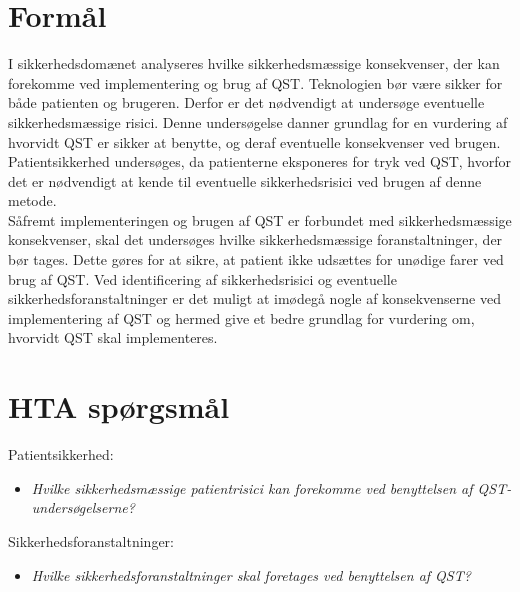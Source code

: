 \section{Formål} 
I sikkerhedsdomænet analyseres hvilke sikkerhedsmæssige konsekvenser, der kan forekomme ved implementering og brug af QST. Teknologien bør være sikker for både patienten og brugeren. Derfor er det nødvendigt at undersøge eventuelle sikkerhedsmæssige risici. Denne undersøgelse danner grundlag for en vurdering af hvorvidt QST er sikker at benytte, og deraf eventuelle konsekvenser ved brugen. \\
Patientsikkerhed undersøges, da patienterne eksponeres for tryk ved QST, hvorfor det er nødvendigt at kende til eventuelle sikkerhedsrisici ved brugen af denne metode. \\
Såfremt implementeringen og brugen af QST er forbundet med sikkerhedsmæssige konsekvenser, skal det undersøges hvilke sikkerhedsmæssige foranstaltninger, der bør tages. Dette gøres for at sikre, at patient ikke udsættes for unødige farer ved brug af QST. Ved identificering af sikkerhedsrisici og eventuelle sikkerhedsforanstaltninger er det muligt at imødegå nogle af konsekvenserne ved implementering af QST og hermed give et bedre grundlag for vurdering om, hvorvidt QST skal implementeres.

\section{HTA spørgsmål}
Patientsikkerhed:
\begin{itemize}
\item \textit{Hvilke sikkerhedsmæssige patientrisici kan forekomme ved benyttelsen af QST-undersøgelserne?} %
\end{itemize}
Sikkerhedsforanstaltninger:
\begin{itemize}
\item \textit{Hvilke sikkerhedsforanstaltninger skal foretages ved benyttelsen af QST?}  %
\end{itemize}

